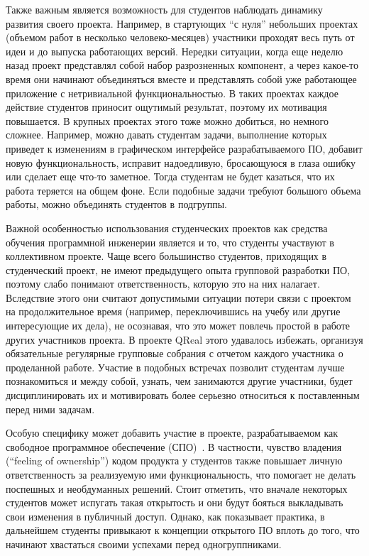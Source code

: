 \documentclass[a4paper]{article}
\begin{document}
Также важным является возможность для студентов наблюдать динамику развития своего проекта. Например, в стартующих ``с нуля'' небольших проектах (объемом работ в несколько человеко-месяцев) участники проходят весь путь от идеи и до выпуска работающих версий. Нередки ситуации, когда еще неделю назад проект представлял собой набор разрозненных компонент, а через какое-то время они начинают объединяться вместе и представлять собой уже работающее приложение с нетривиальной функциональностью. В таких проектах каждое действие студентов приносит ощутимый результат, поэтому их мотивация повышается. В крупных проектах этого тоже можно добиться, но немного сложнее. Например, можно давать студентам задачи, выполнение которых приведет к изменениям в графическом интерфейсе разрабатываемого ПО, добавит новую функциональность, исправит надоедливую, бросающуюся в глаза ошибку или сделает еще что-то заметное. Тогда студентам не будет казаться, что их работа теряется на общем фоне. Если подобные задачи требуют большого объема работы, можно объединять студентов в подгруппы.

Важной особенностью использования студенческих проектов как средства обучения программной инженерии является и то, что студенты участвуют в коллективном проекте. Чаще всего большинство студентов, приходящих в студенческий проект, не имеют предыдущего опыта групповой разработки ПО, поэтому слабо понимают ответственность, которую это на них налагает. Вследствие этого они считают допустимыми ситуации потери связи с проектом на продолжительное время (например, переключившись на учебу или другие интересующие их дела), не осознавая, что это может повлечь простой в работе других участников проекта. В проекте QReal этого удавалось избежать, организуя обязательные регулярные групповые собрания с отчетом каждого участника о проделанной работе. Участие в подобных встречах позволит студентам лучше познакомиться и между собой, узнать, чем занимаются другие участники, будет дисциплинировать их и мотивировать более серьезно относиться к поставленным перед ними задачам.

Особую специфику может добавить участие в проекте, разрабатываемом как свободное программное обеспечение (СПО)~\cite{saratov}. В частности, чувство владения (``feeling of ownership'') кодом продукта у студентов также повышает личную ответственность за реализуемую ими функциональность, что помогает не делать поспешных и необдуманных решений. Стоит отметить, что вначале некоторых студентов может испугать такая открытость и они будут бояться выкладывать свои изменения в публичный доступ. Однако, как показывает практика, в дальнейшем студенты привыкают к концепции открытого ПО вплоть до того, что начинают хвастаться своими успехами перед одногруппниками.
\end{document}
